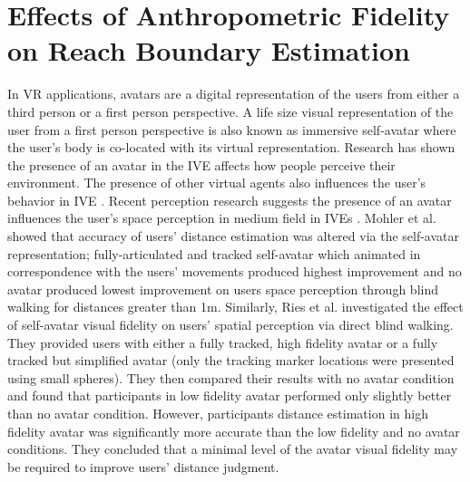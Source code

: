 
\chapter{Effects of Anthropometric Fidelity on Reach Boundary Estimation}%

In VR applications, avatars are a digital representation of the users from either a third person or a first person perspective. A life size visual representation of the user from a first person perspective is also known as immersive self-avatar where the user's body is co-located with its virtual representation. Research has shown the presence of an avatar in the IVE affects how people perceive their environment. The presence of other virtual agents also influences the user's behavior in IVE \cite{HUH10,SAD+06,ZUG+07}. Recent perception research suggests the presence of an avatar influences the user's space perception in medium field in IVEs \cite{MCW+10,LNW+03,WJS+08}. Mohler et al. \cite{MCW+10} showed that accuracy of users' distance estimation was altered via the self-avatar representation; fully-articulated and tracked self-avatar which animated in correspondence with the users' movements produced highest improvement and no avatar produced lowest improvement on users space perception through blind walking for distances greater than 1m. Similarly, Ries et al. \cite{RIM+09} investigated the effect of self-avatar visual fidelity on users' spatial perception via direct blind walking. They provided users with either a fully tracked, high fidelity avatar or a fully tracked but simplified avatar (only the tracking marker locations were presented using small spheres). They then compared their results with no avatar condition and found that participants in low fidelity avatar performed only slightly better than no avatar condition. However, participants distance estimation in high fidelity avatar was significantly more accurate than the low fidelity and no avatar conditions. They concluded that a minimal level of the avatar visual fidelity may be required to improve users' distance judgment. 

